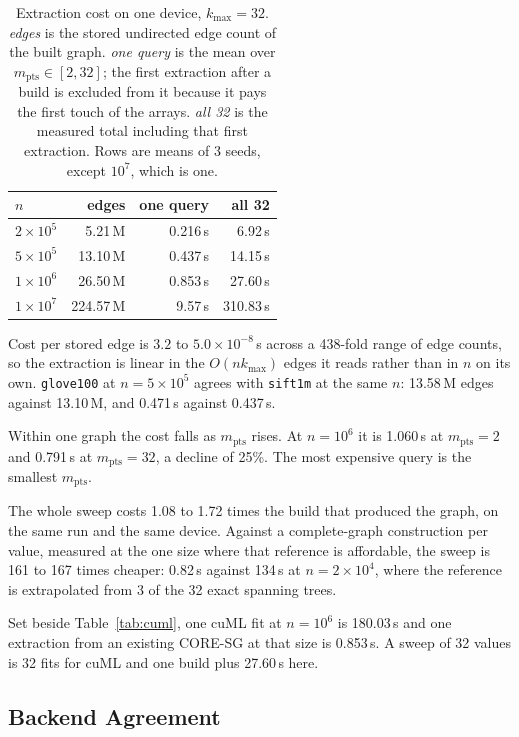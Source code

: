 \documentclass{ieeeaccess}
\newcommand{\kmax}{k_{\max}}
\newcommand{\mpts}{m_{\mathrm{pts}}}
\begin{document}
\begin{table}[!t]
\caption{Extraction cost on one device, $\kmax = 32$. \emph{edges} is the stored
undirected edge count of the built graph. \emph{one query} is the mean over
$\mpts \in [2, 32]$; the first extraction after a build is excluded from it
because it pays the first touch of the arrays. \emph{all 32} is the measured
total including that first extraction. Rows are means of 3 seeds, except
$10^7$, which is one.}
\label{tab:extract}
\centering
\footnotesize
\begin{tabular}{@{}lrrr@{}}
\toprule
$n$ & edges & one query & all 32 \\
\midrule
$2\times10^5$ & 5.21\,M   & 0.216\,s & 6.92\,s   \\
$5\times10^5$ & 13.10\,M  & 0.437\,s & 14.15\,s  \\
$1\times10^6$ & 26.50\,M  & 0.853\,s & 27.60\,s  \\
$1\times10^7$ & 224.57\,M & 9.57\,s  & 310.83\,s \\
\bottomrule
\end{tabular}
\end{table}

Cost per stored edge is $3.2$ to $5.0\times10^{-8}$\,s across a 438-fold range of
edge counts, so the extraction is linear in the $O(n\kmax)$ edges it reads rather
than in $n$ on its own. \texttt{glove100} at $n = 5\times10^5$ agrees with
\texttt{sift1m} at the same $n$: 13.58\,M edges against 13.10\,M, and 0.471\,s
against 0.437\,s.

Within one graph the cost falls as $\mpts$ rises. At $n = 10^6$ it is 1.060\,s at
$\mpts = 2$ and 0.791\,s at $\mpts = 32$, a decline of 25\%. The most expensive
query is the smallest $\mpts$.

The whole sweep costs 1.08 to 1.72 times the build that produced the graph, on
the same run and the same device. Against a complete-graph construction per
value, measured at the one size where that reference is affordable, the sweep is
161 to 167 times cheaper: 0.82\,s against 134\,s at $n = 2\times10^4$, where the
reference is extrapolated from 3 of the 32 exact spanning trees.

Set beside Table~\ref{tab:cuml}, one cuML fit at $n = 10^6$ is 180.03\,s and one
extraction from an existing CORE-SG at that size is 0.853\,s. A sweep of 32
values is 32 fits for cuML and one build plus 27.60\,s here.

\subsection{Backend Agreement}
\label{sec:parity}
\end{document}
